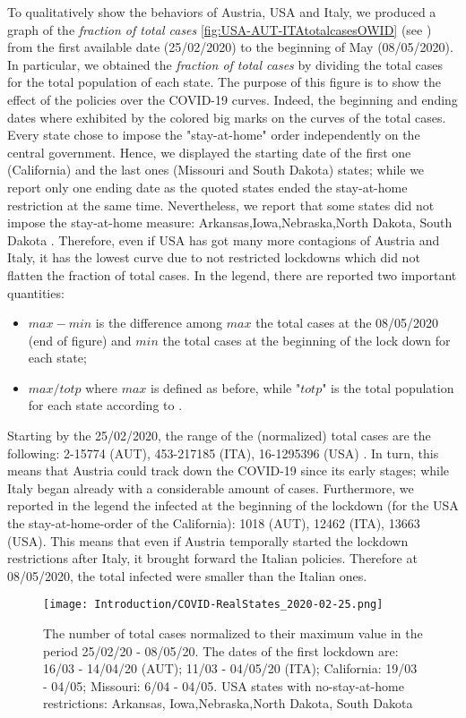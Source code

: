 \documentclass[a4paper,10pt, oneside]{book} %
\theoremstyle{definition}
\begin{document}
To qualitatively show the behaviors of Austria, USA and Italy, we produced a graph of the \textit{fraction of total cases}  \autoref{fig:USA-AUT-ITAtotalcasesOWID} (see \cite{JHUGitHub:2020_TotalCases}) from the first available date (25/02/2020) to the beginning of May (08/05/2020). In particular, we obtained the \textit{fraction of total cases} by dividing the total cases for the total population of each state.
The purpose of this figure is to show the effect of the policies over the COVID-19 curves.
Indeed, the beginning and ending dates where exhibited by the colored big marks on the curves of the total cases. Every state chose to impose the "stay-at-home" order independently on the central government. Hence, we displayed the starting date of the first one (California) and the last ones (Missouri and South Dakota) states; while we report only one ending date as the quoted states ended the stay-at-home restriction at the same time. Nevertheless, we report that some states did not impose the stay-at-home measure: Arkansas,Iowa,Nebraska,North Dakota,	South Dakota \cite{NBC_USA:2020_InitalDates}.
Therefore, even if USA has got many more contagions of Austria and Italy, it has the lowest curve due to not restricted lockdowns which did not flatten the fraction of total cases. 
In the legend, there are reported two important quantities:
\begin{itemize}
	\item $max - min$ is the difference among $max$ the total cases at the 08/05/2020 (end of figure) and $min$ the total cases at the beginning of the lock down for each state;
	\item $max / totp$ where $max$ is defined as before, while "$totp$" is the total population for each state according to \cite{PopulationEstimate}.
\end{itemize}
Starting by the 25/02/2020, the range of the (normalized) total cases are the following: 2-15774 (AUT), 453-217185 (ITA), 16-1295396 (USA) \cite{JHUGitHub:2020_TotalCases}. In turn, this means that Austria could track down the COVID-19 since its early stages; while Italy began already with a considerable amount of cases. Furthermore, we reported in the legend the infected at the beginning of the lockdown (for the USA the stay-at-home-order of the California): 1018 (AUT), 12462 (ITA), 13663 (USA). This means that even if Austria temporally started the lockdown restrictions after Italy, it brought forward the Italian policies. Therefore at 08/05/2020, the total infected were smaller than the Italian ones.
\begin{figure}[tbp]
	\centering
	\texttt{[image: Introduction/COVID-RealStates\_2020-02-25.png]}
	\caption{The number of total cases normalized to their maximum value in the period 25/02/20 - 08/05/20. The dates of the first lockdown are: 16/03 - 14/04/20 (AUT); 11/03 - 04/05/20 (ITA); California: 19/03 - 04/05; Missouri: 6/04 - 04/05. USA states with no-stay-at-home restrictions: Arkansas,	Iowa,Nebraska,North Dakota,	South Dakota}
	\label{fig:USA-AUT-ITAtotalcasesOWID}
\end{figure}
\end{document}
